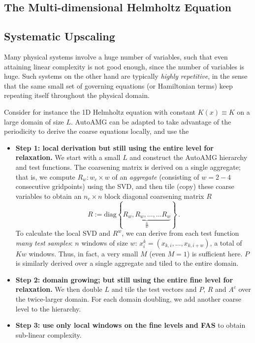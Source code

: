 \documentclass{article}
\begin{document}
\subsection{The Multi-dimensional Helmholtz Equation}
\label{multidim}

\subsection{Systematic Upscaling}
\label{upscaling}
Many physical systems involve a huge number of variables, such that even attaining linear complexity is not good enough, since the number of variables is huge. Such systems on the other hand are typically \emph{highly repetitive}, in the sense that the same small set of governing equations (or Hamiltonian terms) keep repeating itself throughout the physical domain. 

Consider for instance the 1D Helmholtz equation with constant $K(x) \equiv K$ on a large domain of size $L$. AutoAMG can be adapted to take advantage of the periodicity to derive the coarse equations locally, and use the 

\begin{itemize}
\item {\bf Step 1: local derivation but still using the entire level for relaxation.}
We start with a small $L$ and construct the AutoAMG hierarchy and test functions. The coarsening matrix is derived on a single aggregate; that is, we compute $R_w: w_c \times w$ of an \emph{aggregate} (consisting of $w = 2-4$ consecutive gridpoints) using the SVD, and then  tile (copy) these coarse variables to obtain an $n_c \times n$ block diagonal coarsening matrix $R$
\begin{equation}
	R := \text{diag} \left\{ \underbrace{R_w, R_w, \dots, ... R_w }_{\frac{n}{w}}  \right\} \,.
\end{equation}
To calculate the local SVD and $R^w$, we can derive from each test function \emph{many test samples}: $n$ windows of size $w$: $x^k_i = (x_{k,i},\dots,x_{k,i+w})$, a total of $Kw$ windows. Thus, in fact, a very small $M$ (even $M=1$) is sufficient here. $P$ is similarly derived over a single aggregate and tiled to the entire domain.

\item {\bf Step 2: domain growing; but still using the entire fine level for relaxation.} We then double $L$ and tile the test vectors and $P$, $R$ and $A^c$ over the twice-larger domain. For each domain doubling, we add another coarse level to the hierarchy. 

\item {\bf Step 3: use only local windows on the fine levels and FAS} to obtain sub-linear complexity.
\end{itemize}
\end{document}
